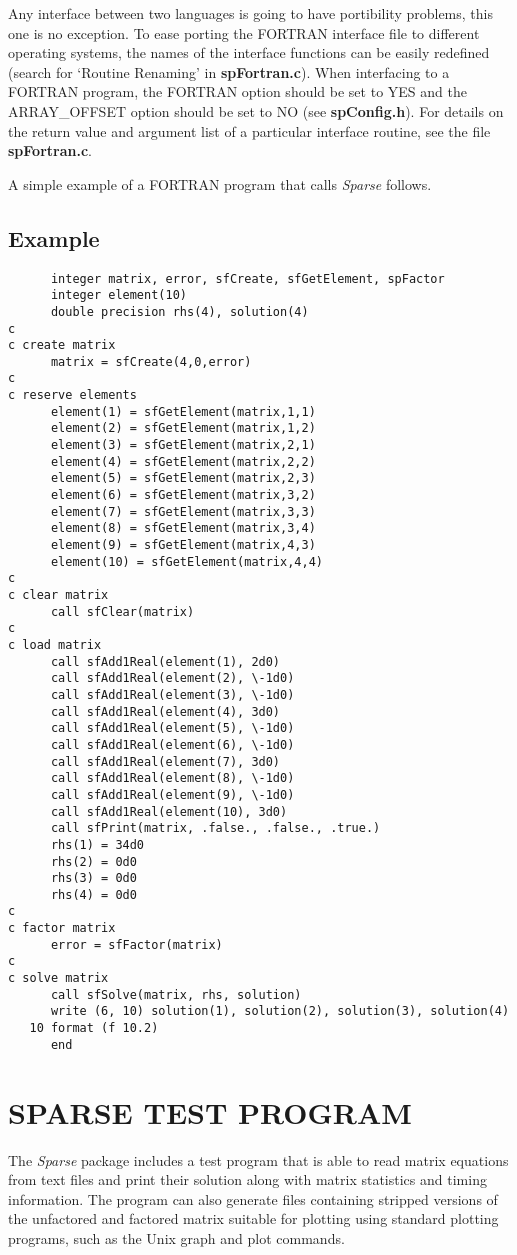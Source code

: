 \documentclass[11pt]{article}
\begin{document}
Any interface between two languages is going to have portibility
problems, this one is no exception.  To ease porting the FORTRAN
interface file to different operating systems, the names of the
interface functions can be easily redefined (search for `Routine
Renaming' in {\bf spFortran.c}).  When interfacing to a FORTRAN program,
the FORTRAN option should be set to YES and the ARRAY\_OFFSET option
should be set to NO (see {\bf spConfig.h}).  For details on the return
value and argument list of a particular interface routine, see the
file {\bf spFortran.c}.

A simple example of a FORTRAN program that calls \emph{Sparse} follows.

\subsection{Example}
\begin{verbatim}
      integer matrix, error, sfCreate, sfGetElement, spFactor
      integer element(10)
      double precision rhs(4), solution(4)
c
c create matrix
      matrix = sfCreate(4,0,error)
c
c reserve elements
      element(1) = sfGetElement(matrix,1,1)
      element(2) = sfGetElement(matrix,1,2)
      element(3) = sfGetElement(matrix,2,1)
      element(4) = sfGetElement(matrix,2,2)
      element(5) = sfGetElement(matrix,2,3)
      element(6) = sfGetElement(matrix,3,2)
      element(7) = sfGetElement(matrix,3,3)
      element(8) = sfGetElement(matrix,3,4)
      element(9) = sfGetElement(matrix,4,3)
      element(10) = sfGetElement(matrix,4,4)
c
c clear matrix
      call sfClear(matrix)
c
c load matrix
      call sfAdd1Real(element(1), 2d0)
      call sfAdd1Real(element(2), \-1d0)
      call sfAdd1Real(element(3), \-1d0)
      call sfAdd1Real(element(4), 3d0)
      call sfAdd1Real(element(5), \-1d0)
      call sfAdd1Real(element(6), \-1d0)
      call sfAdd1Real(element(7), 3d0)
      call sfAdd1Real(element(8), \-1d0)
      call sfAdd1Real(element(9), \-1d0)
      call sfAdd1Real(element(10), 3d0)
      call sfPrint(matrix, .false., .false., .true.)
      rhs(1) = 34d0
      rhs(2) = 0d0
      rhs(3) = 0d0
      rhs(4) = 0d0
c
c factor matrix
      error = sfFactor(matrix)
c
c solve matrix
      call sfSolve(matrix, rhs, solution)
      write (6, 10) solution(1), solution(2), solution(3), solution(4)
   10 format (f 10.2)
      end
\end{verbatim}

\section{SPARSE TEST PROGRAM}
The \emph{Sparse} package includes a test program that is able to read
matrix equations from text files and print their solution along with
matrix statistics and timing information.  The program can also generate
files containing stripped versions of the unfactored and factored matrix
suitable for plotting using standard plotting programs, such as the
{\sc Unix} graph and plot commands.
\end{document}
